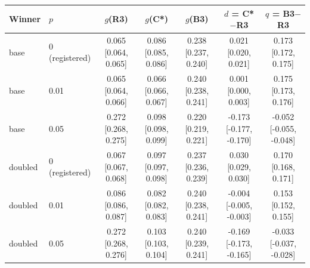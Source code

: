 \begin{tabular}{llccccc}
\toprule
Winner & $p$ & $g$(R3) & $g$(C*) & $g$(B3) & $d$ = C*$-$R3 & $q$ = B3$-$R3 \\
\midrule
base & 0 (registered) & 0.065 [0.064, 0.065] & 0.086 [0.085, 0.086] & 0.238 [0.237, 0.240] & 0.021 [0.020, 0.021] & 0.173 [0.172, 0.175] \\
base & 0.01 & 0.065 [0.064, 0.066] & 0.066 [0.066, 0.067] & 0.240 [0.238, 0.241] & 0.001 [0.000, 0.003] & 0.175 [0.173, 0.176] \\
base & 0.05 & 0.272 [0.268, 0.275] & 0.098 [0.098, 0.099] & 0.220 [0.219, 0.221] & -0.173 [-0.177, -0.170] & -0.052 [-0.055, -0.048] \\
doubled & 0 (registered) & 0.067 [0.067, 0.068] & 0.097 [0.097, 0.098] & 0.237 [0.236, 0.239] & 0.030 [0.029, 0.030] & 0.170 [0.168, 0.171] \\
doubled & 0.01 & 0.086 [0.086, 0.087] & 0.082 [0.082, 0.083] & 0.240 [0.238, 0.241] & -0.004 [-0.005, -0.003] & 0.153 [0.152, 0.155] \\
doubled & 0.05 & 0.272 [0.268, 0.276] & 0.103 [0.103, 0.104] & 0.240 [0.239, 0.241] & -0.169 [-0.173, -0.165] & -0.033 [-0.037, -0.028] \\
\bottomrule
\end{tabular}
